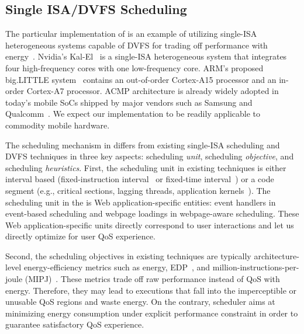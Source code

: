 \subsection{Single ISA/DVFS Scheduling}
\label{sec:runtime:related:sched}

The particular implementation of \webrt is an example of utilizing single-ISA heterogeneous systems capable of DVFS for trading off performance with energy~\cite{single-ISA}. Nvidia's Kal-El~\cite{Tegra3} is a single-ISA heterogeneous system that integrates four high-frequency cores with one low-frequency core. ARM's proposed big.LITTLE system~\cite{big.little} contains an out-of-order Cortex-A15 processor and an in-order Cortex-A7 processor. ACMP architecture is already widely adopted in today's mobile SoCs shipped by major vendors such as Samsung and Qualcomm~\cite{exynos5biglittle}. We expect our \webrt implementation to be readily applicable to commodity mobile hardware.

The scheduling mechanism in \webrt differs from existing single-ISA scheduling and DVFS techniques in three key aspects: scheduling \textit{unit}, scheduling \textit{objective}, and scheduling \textit{heuristics}. First, the scheduling unit in existing techniques is either interval based (fixed-instruction interval~\cite{single-ISA,compositecores,tracephase,tm,DVFSPred} or fixed-time interval~\cite{DCS,MIPJ,PIE,ondemand,unfairsched}) or a code segment (e.g., critical sections, lagging threads, application kernels~\cite{acs,bis,uba,YinYang}). The scheduling unit in the \webrt is Web application-specific entities: event handlers in event-based scheduling and webpage loadings in webpage-aware scheduling. These Web application-specific units directly correspond to user interactions and let us directly optimize for user QoS experience.

Second, the scheduling objectives in existing techniques are typically architecture-level energy-efficiency metrics such as energy, EDP~\cite{edp}, and million-instructions-per-joule (MIPJ)~\cite{MIPJ}. These metrics trade off raw performance instead of QoS with energy. Therefore, they may lead to executions that fall into the imperceptible or unusable QoS regions and waste energy. On the contrary, \webrt scheduler  aims at minimizing energy consumption under explicit performance constraint in order to guarantee satisfactory QoS experience.

